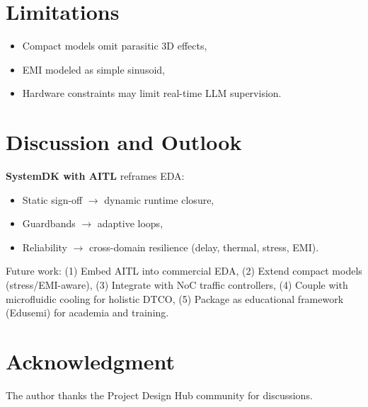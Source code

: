 \documentclass[conference]{IEEEtran}
\begin{document}
\section{Limitations}
\begin{itemize}
  \item Compact models omit parasitic 3D effects,
  \item EMI modeled as simple sinusoid,
  \item Hardware constraints may limit real-time LLM supervision.
\end{itemize}

\section{Discussion and Outlook}
\textbf{SystemDK with AITL} reframes EDA:
\begin{itemize}
  \item Static sign-off $\to$ dynamic runtime closure,
  \item Guardbands $\to$ adaptive loops,
  \item Reliability $\to$ cross-domain resilience (delay, thermal, stress, EMI).
\end{itemize}
Future work:
(1) Embed AITL into commercial EDA,
(2) Extend compact models (stress/EMI-aware),
(3) Integrate with NoC traffic controllers,
(4) Couple with microfluidic cooling for holistic DTCO,
(5) Package as educational framework (Edusemi) for academia and training.

\section*{Acknowledgment}
The author thanks the Project Design Hub community for discussions.




\end{document}
